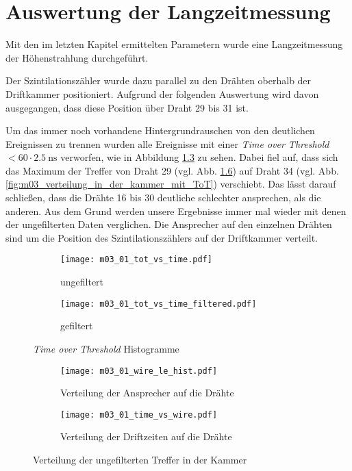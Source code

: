 \documentclass[11pt, ngerman, fleqn, DIV=15, headinclude, BCOR=2cm]{scrreprt}
\begin{document}
\clearpage


\chapter{Auswertung der Langzeitmessung}

Mit den im letzten Kapitel ermittelten Parametern wurde eine Langzeitmessung
der Höhenstrahlung durchgeführt.

Der Szintilationszähler wurde dazu parallel zu den Drähten oberhalb der
Driftkammer positioniert. Aufgrund der folgenden Auswertung wird davon
ausgegangen, dass diese Position über Draht 29 bis 31 ist.

Um das immer noch vorhandene Hintergrundrauschen von den deutlichen
Ereignissen zu trennen wurden alle Ereignisse mit einer \emph{Time over
Threshold} $ < 60 \cdot \SI{2.5}{\nano\second}$ verworfen, wie in Abbildung
\ref{fig:m03_tot_vs_time} zu sehen.
Dabei fiel auf, dass sich das Maximum der Treffer von Draht 29
(vgl. Abb. \ref{fig:m03_verteilung_in_der_kammer}) auf Draht 34 (vgl. Abb.
\ref{fig:m03_verteilung_in_der_kammer_mit_ToT}) verschiebt. Das lässt darauf
schließen, dass die Drähte 16 bis 30 deutliche schlechter ansprechen, als die
anderen. Aus dem Grund werden unsere Ergebnisse immer mal wieder mit denen der
ungefilterten Daten verglichen.
Die Ansprecher auf den einzelnen Drähten sind um die Position des
Szintilationszählers auf der Driftkammer verteilt.


\begin{figure}
	\centering
	\begin{subfigure}{0.49 \linewidth}
		\texttt{[image: m03\_01\_tot\_vs\_time.pdf]}
		\caption{%
			ungefiltert
		}
		\label{fig:m03_tot_vs_time_unfiltered}
	\end{subfigure}
	\begin{subfigure}{0.49 \linewidth}
		\texttt{[image: m03\_01\_tot\_vs\_time\_filtered.pdf]}
		\caption{%
			gefiltert
		}
		\label{fig:m03_tot_vs_time_filtered}
	\end{subfigure}
	\caption{%
		\emph{Time over Threshold} Histogramme
	}
	\label{fig:m03_tot_vs_time}
\end{figure}

\begin{figure}
	\centering
	\begin{subfigure}{0.49 \linewidth}
		\texttt{[image: m03\_01\_wire\_le\_hist.pdf]}
		\caption{%
			Verteilung der Ansprecher auf die Drähte
		}
		\label{fig:m03_wire_le_hist_filtered}
	\end{subfigure}
	\begin{subfigure}{0.49 \linewidth}
		\texttt{[image: m03\_01\_time\_vs\_wire.pdf]}
		\caption{%
			Verteilung der Driftzeiten auf die Drähte
		}
		\label{fig:m03_time_vs_wire_filtered}
	\end{subfigure}
	\caption{%
		Verteilung der ungefilterten Treffer in der Kammer
	}
	\label{fig:m03_verteilung_in_der_kammer}
\end{figure}
\end{document}
